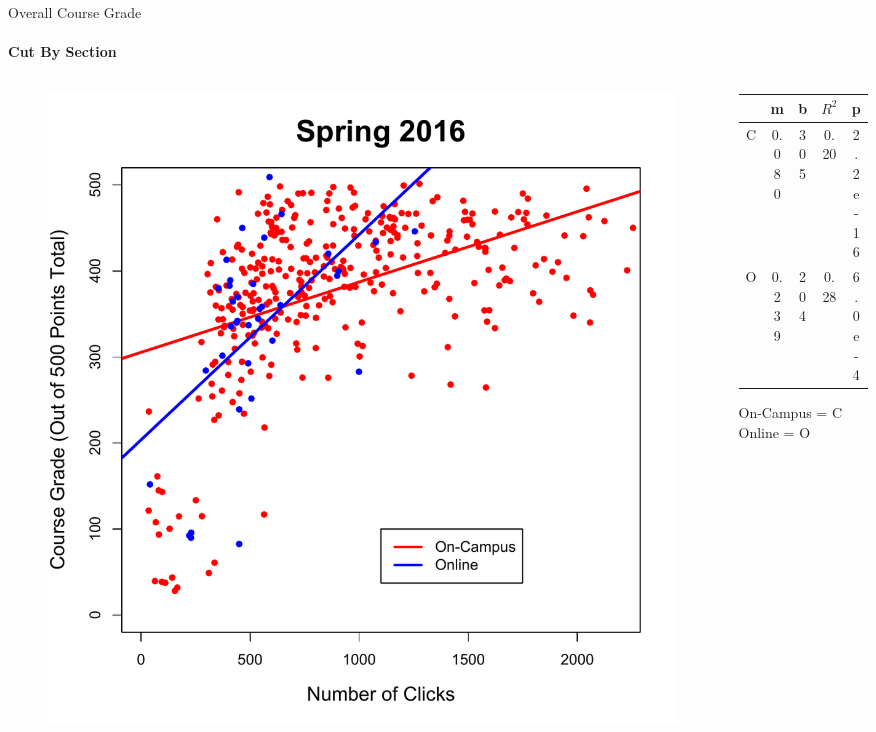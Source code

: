 \documentclass[xcolor=x11names,compress]{beamer}
\begin{document}
\begin{frame}{Overall Course Grade}
	\framesubtitle{Cut By Section}
	\begin{columns}
		\begin{column}{0.5\textwidth}
			\begin{figure}
				\includegraphics[width=1.0\textwidth]{img/overall_sp16_section.pdf}
			\end{figure}
		\end{column}
		\begin{column}{0.5\textwidth}	
			\begin{table}[ht]
				\begin{tabular}{|c|c|c|c|c|}
					\hline
					& \textbf{m} & \textbf{b} & \textbf{$R^2$} & \textbf{p}\\
					\hline
					C & 0.080 & 305 & 0.20 & 2.2e-16 \\
					O & 0.239 & 204 & 0.28 & 6.0e-4\\
					\hline
				\end{tabular}
			\end{table}
			On-Campus = C\\
			Online = O
		\end{column}
	\end{columns}
\end{frame}
\end{document}
